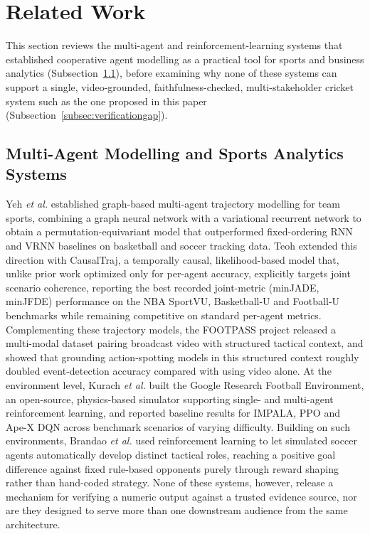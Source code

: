 \section{Related Work}
\label{sec:relatedwork}

This section reviews the multi-agent and reinforcement-learning systems that established cooperative agent modelling as a practical tool for sports and business analytics (Subsection~\ref{subsec:magentsystems}), before examining why none of these systems can support a single, video-grounded, faithfulness-checked, multi-stakeholder cricket system such as the one proposed in this paper (Subsection~\ref{subsec:verificationgap}).

\subsection{Multi-Agent Modelling and Sports Analytics Systems}
\label{subsec:magentsystems}
Yeh \textit{et al.} \cite{ref1} established graph-based multi-agent trajectory modelling for team sports, combining a graph neural network with a variational recurrent network to obtain a permutation-equivariant model that outperformed fixed-ordering RNN and VRNN baselines on basketball and soccer tracking data. Teoh \cite{ref2} extended this direction with CausalTraj, a temporally causal, likelihood-based model that, unlike prior work optimized only for per-agent accuracy, explicitly targets joint scenario coherence, reporting the best recorded joint-metric (minJADE, minJFDE) performance on the NBA SportVU, Basketball-U and Football-U benchmarks while remaining competitive on standard per-agent metrics. Complementing these trajectory models, the FOOTPASS project \cite{ref3} released a multi-modal dataset pairing broadcast video with structured tactical context, and showed that grounding action-spotting models in this structured context roughly doubled event-detection accuracy compared with using video alone. At the environment level, Kurach \textit{et al.} \cite{ref4} built the Google Research Football Environment, an open-source, physics-based simulator supporting single- and multi-agent reinforcement learning, and reported baseline results for IMPALA, PPO and Ape-X DQN across benchmark scenarios of varying difficulty. Building on such environments, Brandao \textit{et al.} \cite{ref5} used reinforcement learning to let simulated soccer agents automatically develop distinct tactical roles, reaching a positive goal difference against fixed rule-based opponents purely through reward shaping rather than hand-coded strategy. None of these systems, however, release a mechanism for verifying a numeric output against a trusted evidence source, nor are they designed to serve more than one downstream audience from the same architecture.

